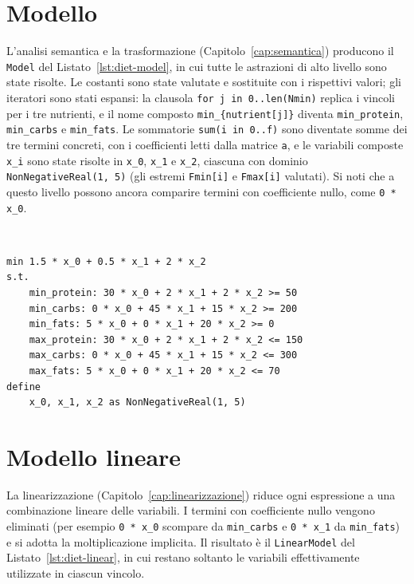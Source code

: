 \section{Modello}
\label{app:diet-model}

L'analisi semantica e la trasformazione (Capitolo~\ref{cap:semantica}) producono
il \texttt{Model} del Listato~\ref{lst:diet-model}, in cui tutte le astrazioni di
alto livello sono state risolte. Le costanti sono state valutate e sostituite con
i rispettivi valori; gli iteratori sono stati espansi: la clausola
\texttt{for j in 0..len(Nmin)} replica i vincoli per i tre nutrienti, e il nome
composto \texttt{min\_\{nutrient[j]\}} diventa \texttt{min\_protein},
\texttt{min\_carbs} e \texttt{min\_fats}. Le sommatorie \texttt{sum(i in 0..f)}
sono diventate somme dei tre termini concreti, con i coefficienti letti dalla
matrice \texttt{a}, e le variabili composte \texttt{x\_i} sono state risolte in
\texttt{x\_0}, \texttt{x\_1} e \texttt{x\_2}, ciascuna con dominio
\texttt{NonNegativeReal(1, 5)} (gli estremi \texttt{Fmin[i]} e \texttt{Fmax[i]}
valutati). Si noti che a questo livello possono ancora comparire termini con
coefficiente nullo, come \texttt{0 * x\_0}.

\

\begin{lstlisting}[language=rooc, caption={Il \texttt{Model} dopo l'analisi semantica.}, label={lst:diet-model}]
min 1.5 * x_0 + 0.5 * x_1 + 2 * x_2
s.t.
    min_protein: 30 * x_0 + 2 * x_1 + 2 * x_2 >= 50
    min_carbs: 0 * x_0 + 45 * x_1 + 15 * x_2 >= 200
    min_fats: 5 * x_0 + 0 * x_1 + 20 * x_2 >= 0
    max_protein: 30 * x_0 + 2 * x_1 + 2 * x_2 <= 150
    max_carbs: 0 * x_0 + 45 * x_1 + 15 * x_2 <= 300
    max_fats: 5 * x_0 + 0 * x_1 + 20 * x_2 <= 70
define
    x_0, x_1, x_2 as NonNegativeReal(1, 5)
\end{lstlisting}

\section{Modello lineare}
\label{app:diet-linear}

La linearizzazione (Capitolo~\ref{cap:linearizzazione}) riduce ogni espressione a
una combinazione lineare delle variabili. I termini con coefficiente nullo vengono
eliminati (per esempio \texttt{0 * x\_0} scompare da \texttt{min\_carbs} e
\texttt{0 * x\_1} da \texttt{min\_fats}) e si adotta la moltiplicazione implicita.
Il risultato è il \texttt{LinearModel} del Listato~\ref{lst:diet-linear}, in cui
restano soltanto le variabili effettivamente utilizzate in ciascun vincolo.

